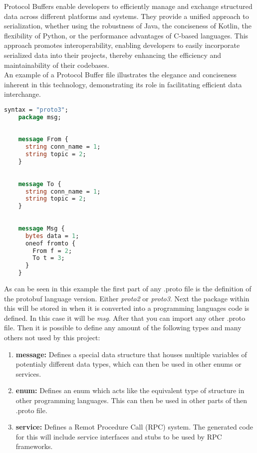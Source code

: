 Protocol Buffers enable developers to efficiently manage and exchange structured data across different platforms and systems. They provide a unified approach 
to serialization, whether using the robustness of Java, the conciseness of Kotlin, the flexibility of Python, or the performance advantages of C-based languages. 
This approach promotes interoperability, enabling developers to easily incorporate serialized data into their projects, thereby enhancing the efficiency and 
maintainability of their codebases.\\

An example of a Protocol Buffer file illustrates the elegance and conciseness inherent in this technology, demonstrating its role in facilitating efficient 
data interchange.

\begin{minipage}{\textwidth}
\begin{lstlisting}[language=ProtoBuf, caption=Excerpt taken from the ProtoBuf files of this project]
    syntax = "proto3";
    package msg;
    
    
    message From {
      string conn_name = 1;
      string topic = 2;
    }
    
    
    message To {
      string conn_name = 1;
      string topic = 2;
    }
    
    
    message Msg {
      bytes data = 1;
      oneof fromto {
        From f = 2;
        To t = 3;
      }
    }
\end{lstlisting}
\end{minipage}

As can be seen in this example the first part of any .proto file is the definition of the protobuf language version. Either \textit{proto2} or \textit{proto3}. Next the package within this will be 
stored in when it is converted into a programming languages code is defined. In this case it will be \textit{msg}. After that you can import any other .proto file.
Then it is possible to define any amount of the following types and many others not used by this project:
\begin{enumerate}
    \item \textbf{message:} Defines a special data structure that houses multiple variables of potentialy different data types, which can then be used in other enums or services.
    \item \textbf{enum:} Defines an enum which acts like the equivalent type of structure in other programming languages. This can then be used in other parts of then .proto file.
    \item \textbf{service:} Defines a Remot Procedure Call (RPC) system. The generated code for this will include service interfaces and stubs to be used by RPC frameworks.
\end{enumerate}

